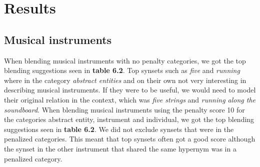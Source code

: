 
\chapter{Results} %

\label{Chapter6} %


\section{Musical instruments}
When blending musical instruments with no penalty categories, we got the top blending suggestions seen in \textbf{table 6.2}. Top synsets such as \emph{five} and \emph{running} where in the category \emph{abstract entities} and on their own not very interesting in describing musical instruments. If they were to be useful, we would need to model their original relation in the context, which was \emph{five strings} and \emph{running along the soundboard}.
When blending musical instruments using the penalty score 10 for the categories abstract entity, instrument and individual, we got the top blending suggestions seen in \textbf{table 6.2}. We did not exclude synsets that were in the penalized categories. This meant that top synsets often got a good score although the synset in the other instrument that shared the same hypernym was in a penalized category.
